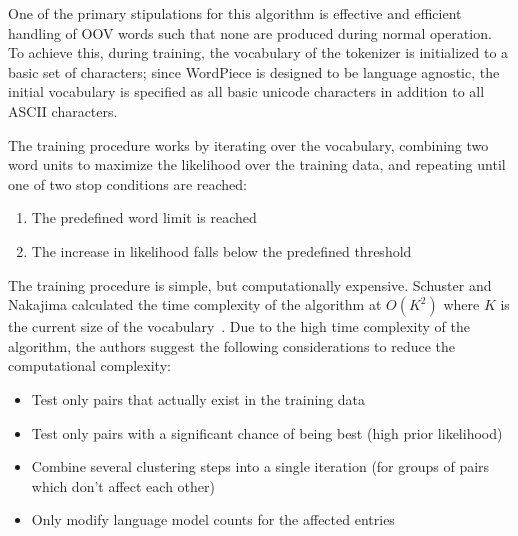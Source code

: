 \documentclass[12pt]{article}
\begin{document}
One of the primary stipulations for this algorithm is effective and efficient handling of OOV words such that none are produced during normal
operation. To achieve this, during training, the vocabulary of the tokenizer is initialized to a basic set of characters; since WordPiece is designed
to be language agnostic, the initial vocabulary is specified as all basic unicode characters in addition to all ASCII characters.

The training procedure works by iterating over the vocabulary, combining two word units to maximize the likelihood over the training data, and
repeating until one of two stop conditions are reached:

\begin{enumerate}
    \item The predefined word limit is reached
    \item The increase in likelihood falls below the predefined threshold
\end{enumerate}

The training procedure is simple, but computationally expensive. Schuster and Nakajima calculated the time complexity of the algorithm at $O(K^2)$
where $K$ is the current size of the vocabulary~\cite{schuster_japanese_2012}. Due to the high time complexity of the algorithm, the authors suggest
the following considerations to reduce the computational complexity:

\begin{itemize}
    \item Test only pairs that actually exist in the training data
    \item Test only pairs with a significant chance of being best (high prior likelihood)
    \item Combine several clustering steps into a single iteration (for groups of pairs which don't affect each other)
    \item Only modify language model counts for the affected entries
\end{itemize}
\end{document}
